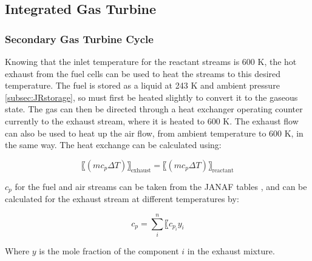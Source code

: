 \documentclass{article}
\begin{document}
\subsection{Integrated Gas Turbine}
\label{LMintegratedgascycle}
\subsubsection{Secondary Gas Turbine Cycle}
        
Knowing that the inlet temperature for the reactant streams is 600 K, the hot exhaust from the fuel cells can be used to heat the streams to this desired temperature. The fuel is stored as a liquid at 243 K and ambient pressure \ref{subsec:JRstorage}, so must first be heated slightly to convert it to the gaseous state. The gas can then be directed through a heat exchanger operating counter currently to the exhaust stream, where it is heated to 600 K. The exhaust flow can also be used to heat up the air flow, from ambient temperature to 600 K, in the same way. The heat exchange can be calculated using:

\begin{equation}
 〖(mc_p \Delta T)〗_{\text{exhaust}}= 〖(mc_p \Delta T)〗_{\text{reactant}}	
 \label{LMeq:heatexchanger}
 \end{equation}
 
$c_p$ for the fuel and air streams can be taken from the JANAF tables \cite{JANAF}, and can be calculated for the exhaust stream at different temperatures by:

\begin{equation}
 c_p= \sum\limits_{i}^n〖c_{p_{i}}  y_i						
  \end{equation}
  
Where $y$ is the mole fraction of the component $i$ in the exhaust mixture. 

\end{document}
